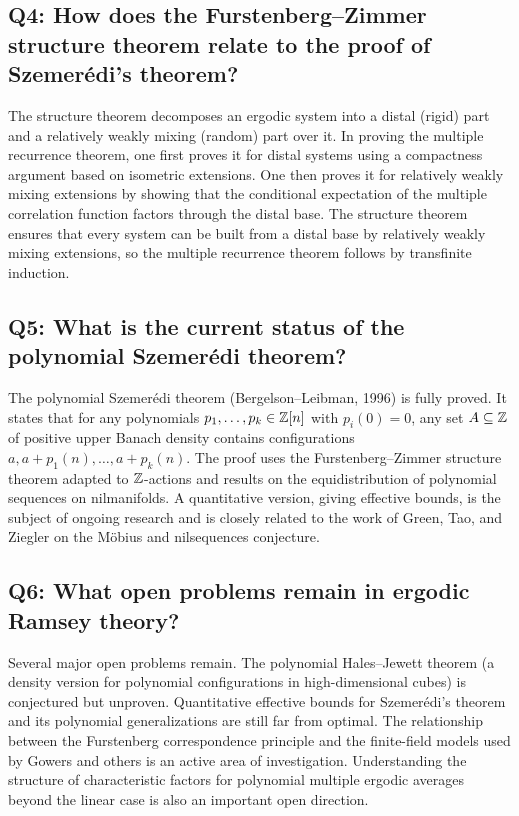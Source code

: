 \subsection*{Q4: How does the Furstenberg--Zimmer structure theorem relate to the proof of Szemer\'edi's theorem?}

The structure theorem decomposes an ergodic system into a distal (rigid) part and a relatively weakly mixing (random) part over it. In proving the multiple recurrence theorem, one first proves it for distal systems using a compactness argument based on isometric extensions. One then proves it for relatively weakly mixing extensions by showing that the conditional expectation of the multiple correlation function factors through the distal base. The structure theorem ensures that every system can be built from a distal base by relatively weakly mixing extensions, so the multiple recurrence theorem follows by transfinite induction.

\subsection*{Q5: What is the current status of the polynomial Szemer\'edi theorem?}

The polynomial Szemer\'edi theorem (Bergelson--Leibman, 1996) is fully proved. It states that for any polynomials \(p_1,\dots,p_k \in \mathbb{Z}[n]\) with \(p_i(0)=0\), any set \(A \subseteq \mathbb{Z}\) of positive upper Banach density contains configurations \(a, a+p_1(n), \dots, a+p_k(n)\). The proof uses the Furstenberg--Zimmer structure theorem adapted to \(\mathbb{Z}\)-actions and results on the equidistribution of polynomial sequences on nilmanifolds. A quantitative version, giving effective bounds, is the subject of ongoing research and is closely related to the work of Green, Tao, and Ziegler on the M\"obius and nilsequences conjecture.

\subsection*{Q6: What open problems remain in ergodic Ramsey theory?}

Several major open problems remain. The polynomial Hales--Jewett theorem (a density version for polynomial configurations in high-dimensional cubes) is conjectured but unproven. Quantitative effective bounds for Szemer\'edi's theorem and its polynomial generalizations are still far from optimal. The relationship between the Furstenberg correspondence principle and the finite-field models used by Gowers and others is an active area of investigation. Understanding the structure of characteristic factors for polynomial multiple ergodic averages beyond the linear case is also an important open direction.

